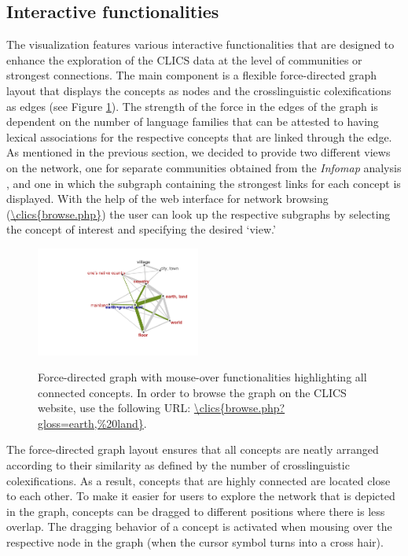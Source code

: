 \subsection{Interactive functionalities}



The visualization features various interactive functionalities that are designed to enhance the exploration of the CLICS data at the level of communities or strongest connections. The main component is a flexible force-directed graph layout that displays the concepts as nodes and the crosslinguistic colexifications as edges (see Figure \ref{EarthLand}). The strength of the force in the edges of the graph is dependent on the number of language families that can be attested to having lexical associations for the respective concepts that are linked through the edge. As mentioned in the previous section, we decided to provide two different views on the network, one for separate communities obtained from the \emph{Infomap} analysis \cite{Rosvall2008}, and one in which the subgraph containing the strongest links for each concept is displayed.  With the help of the web interface for network browsing (\url{\clics{browse.php}}) the user can look up the respective subgraphs by selecting the concept of interest and specifying the desired `view.'

\begin{figure}[htbp]
    \centering
    \href{\clics{browse.php?gloss=earth,\%20land}}{\includegraphics[width=0.48\textwidth,trim=5cm 2cm 1cm 1cm]{img/earthland2.pdf}}
\caption{Force-directed graph with mouse-over functionalities highlighting all connected concepts.
In order to browse the graph on the CLICS website, use the following URL: \url{\clics{browse.php?gloss=earth,\%20land}}.}
\label{EarthLand}
\end{figure}

The force-directed graph layout ensures that all concepts are neatly arranged according to their similarity as defined by the number of crosslinguistic colexifications. As a result, concepts that are highly connected are located close to each other.  To make it easier for users to explore the network that is depicted in the graph, concepts can be dragged to different positions where there is less overlap. The dragging behavior of a concept  is activated when mousing over the respective node in the graph (when the cursor symbol turns into a cross hair). 

